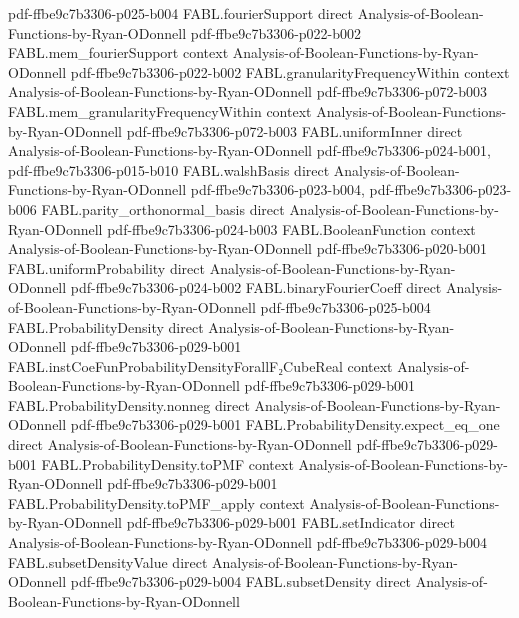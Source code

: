\begin{theorem}
  {pdf-ffbe9c7b3306-p025-b004}
\proofstep
  {FABL.fourierSupport}
  {direct}
  {Analysis-of-Boolean-Functions-by-Ryan-ODonnell}
  {pdf-ffbe9c7b3306-p022-b002}
\proofstep
  {FABL.mem_fourierSupport}
  {context}
  {Analysis-of-Boolean-Functions-by-Ryan-ODonnell}
  {pdf-ffbe9c7b3306-p022-b002}
\proofstep
  {FABL.granularityFrequencyWithin}
  {context}
  {Analysis-of-Boolean-Functions-by-Ryan-ODonnell}
  {pdf-ffbe9c7b3306-p072-b003}
\proofstep
  {FABL.mem_granularityFrequencyWithin}
  {context}
  {Analysis-of-Boolean-Functions-by-Ryan-ODonnell}
  {pdf-ffbe9c7b3306-p072-b003}
\proofstep
  {FABL.uniformInner}
  {direct}
  {Analysis-of-Boolean-Functions-by-Ryan-ODonnell}
  {pdf-ffbe9c7b3306-p024-b001,
    pdf-ffbe9c7b3306-p015-b010}
\proofstep
  {FABL.walshBasis}
  {direct}
  {Analysis-of-Boolean-Functions-by-Ryan-ODonnell}
  {pdf-ffbe9c7b3306-p023-b004,
    pdf-ffbe9c7b3306-p023-b006}
\proofstep
  {FABL.parity_orthonormal_basis}
  {direct}
  {Analysis-of-Boolean-Functions-by-Ryan-ODonnell}
  {pdf-ffbe9c7b3306-p024-b003}
\proofstep
  {FABL.BooleanFunction}
  {context}
  {Analysis-of-Boolean-Functions-by-Ryan-ODonnell}
  {pdf-ffbe9c7b3306-p020-b001}
\proofstep
  {FABL.uniformProbability}
  {direct}
  {Analysis-of-Boolean-Functions-by-Ryan-ODonnell}
  {pdf-ffbe9c7b3306-p024-b002}
\proofstep
  {FABL.binaryFourierCoeff}
  {direct}
  {Analysis-of-Boolean-Functions-by-Ryan-ODonnell}
  {pdf-ffbe9c7b3306-p025-b004}
\proofstep
  {FABL.ProbabilityDensity}
  {direct}
  {Analysis-of-Boolean-Functions-by-Ryan-ODonnell}
  {pdf-ffbe9c7b3306-p029-b001}
\proofstep
  {FABL.instCoeFunProbabilityDensityForallF₂CubeReal}
  {context}
  {Analysis-of-Boolean-Functions-by-Ryan-ODonnell}
  {pdf-ffbe9c7b3306-p029-b001}
\proofstep
  {FABL.ProbabilityDensity.nonneg}
  {direct}
  {Analysis-of-Boolean-Functions-by-Ryan-ODonnell}
  {pdf-ffbe9c7b3306-p029-b001}
\proofstep
  {FABL.ProbabilityDensity.expect_eq_one}
  {direct}
  {Analysis-of-Boolean-Functions-by-Ryan-ODonnell}
  {pdf-ffbe9c7b3306-p029-b001}
\proofstep
  {FABL.ProbabilityDensity.toPMF}
  {context}
  {Analysis-of-Boolean-Functions-by-Ryan-ODonnell}
  {pdf-ffbe9c7b3306-p029-b001}
\proofstep
  {FABL.ProbabilityDensity.toPMF_apply}
  {context}
  {Analysis-of-Boolean-Functions-by-Ryan-ODonnell}
  {pdf-ffbe9c7b3306-p029-b001}
\proofstep
  {FABL.setIndicator}
  {direct}
  {Analysis-of-Boolean-Functions-by-Ryan-ODonnell}
  {pdf-ffbe9c7b3306-p029-b004}
\proofstep
  {FABL.subsetDensityValue}
  {direct}
  {Analysis-of-Boolean-Functions-by-Ryan-ODonnell}
  {pdf-ffbe9c7b3306-p029-b004}
\proofstep
  {FABL.subsetDensity}
  {direct}
  {Analysis-of-Boolean-Functions-by-Ryan-ODonnell}

\end{theorem}
